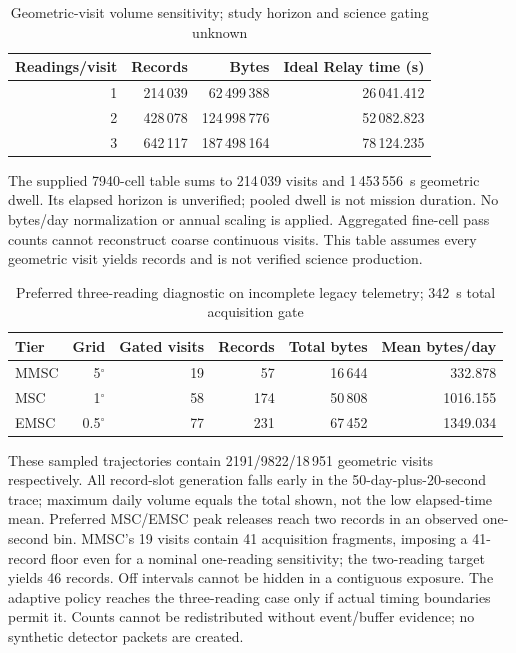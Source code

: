 \begin{table}[H]\centering\small
\caption{Geometric-visit volume sensitivity; study horizon and science gating unknown}\label{tab:grid-v3-volume}
\begin{tabular}{rrrr}\toprule Readings/visit & Records & Bytes & Ideal Relay time (s)\\\midrule
1 & 214\,039 & 62\,499\,388 & 26\,041.412\\
2 & 428\,078 & 124\,998\,776 & 52\,082.823\\
3 & 642\,117 & 187\,498\,164 & 78\,124.235\\\bottomrule\end{tabular}
\end{table}
The supplied 7940-cell table sums to 214\,039 visits and 1\,453\,556~s geometric dwell. Its elapsed horizon is unverified; pooled dwell is not mission duration. No bytes/day normalization or annual scaling is applied. Aggregated fine-cell pass counts cannot reconstruct coarse continuous visits. This table assumes every geometric visit yields records and is not verified science production.

\begin{table}[H]\centering\small
\caption{Preferred three-reading diagnostic on incomplete legacy telemetry; 342~s total acquisition gate}\label{tab:tier-v3}
\begin{tabular}{lrrrrr}\toprule Tier & Grid & Gated visits & Records & Total bytes & Mean bytes/day\\\midrule
MMSC & 5$^\circ$ & 19 & 57 & 16\,644 & 332.878\\
MSC & 1$^\circ$ & 58 & 174 & 50\,808 & 1016.155\\
EMSC & 0.5$^\circ$ & 77 & 231 & 67\,452 & 1349.034\\\bottomrule\end{tabular}
\end{table}
These sampled trajectories contain 2191/9822/18\,951 geometric visits respectively. All record-slot generation falls early in the 50-day-plus-20-second trace; maximum daily volume equals the total shown, not the low elapsed-time mean. Preferred MSC/EMSC peak releases reach two records in an observed one-second bin. MMSC's 19 visits contain 41 acquisition fragments, imposing a 41-record floor even for a nominal one-reading sensitivity; the two-reading target yields 46 records. Off intervals cannot be hidden in a contiguous exposure. The adaptive policy reaches the three-reading case only if actual timing boundaries permit it. Counts cannot be redistributed without event/buffer evidence; no synthetic detector packets are created.

